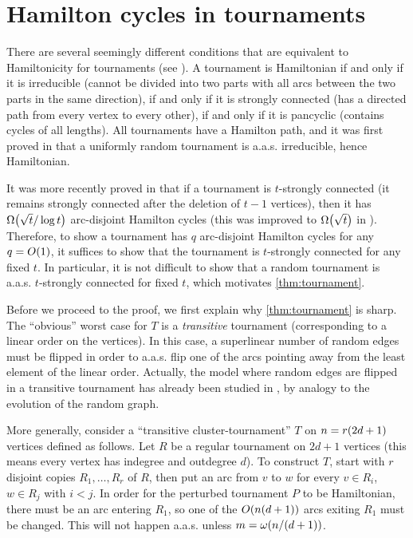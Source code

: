 \documentclass[11pt,english]{article}
\theoremstyle{plain}
\theoremstyle{definition}
\theoremstyle{definition}
\theoremstyle{plain}
\theoremstyle{plain}
\theoremstyle{plain}
\theoremstyle{plain}
\theoremstyle{remark}
\theoremstyle{remark}
\let\originalleft\left
\let\originalright\right
\renewcommand{\left}{\mathopen{}\mathclose\bgroup\originalleft}
\renewcommand{\right}{\aftergroup\egroup\originalright}
\begin{document}
\section{\label{sec:tournaments}Hamilton cycles in tournaments}

There are several seemingly different conditions that are equivalent
to Hamiltonicity for tournaments (see \cite[Chapters~2-3]{Moo68}).
A tournament is Hamiltonian if and only if it is irreducible (cannot
be divided into two parts with all arcs between the two parts
in the same direction), if and only if it is strongly connected (has
a directed path from every vertex to every other), if and only if
it is pancyclic (contains cycles of all lengths). All tournaments
have a Hamilton path, and it was first proved in \cite{MM62} that
a uniformly random tournament is a.a.s. irreducible, hence Hamiltonian.

It was more recently proved in \cite{KLOP14} that if a tournament
is $t$-strongly connected (it remains strongly connected after the
deletion of $t-1$ vertices), then it has $\Omega\left(\sqrt{t}/\log t\right)$
arc-disjoint Hamilton cycles (this was improved to $\Omega\left(\sqrt{t}\right)$
in \cite{Pok14}). Therefore, to show a tournament has $q$ arc-disjoint Hamilton cycles for any $q=O\left(1\right)$, it suffices to show that the tournament is $t$-strongly connected for any fixed $t$. In particular, it is not difficult to show that a random tournament is a.a.s. $t$-strongly connected for fixed $t$, which motivates \ref{thm:tournament}.

Before we proceed to the proof, we first explain why \ref{thm:tournament}
is sharp. The ``obvious'' worst case for $T$ is a \emph{transitive}
tournament (corresponding to a linear order on the vertices). In this
case, a superlinear number of random edges must be flipped in order to a.a.s.
flip one of the arcs pointing away from the least element of the linear
order. Actually, the model where random edges are flipped in a transitive
tournament has already been studied in \cite{LRG96}, by analogy to
the evolution of the random graph.

More generally, consider a ``transitive cluster-tournament'' $T$
on $n=r\left(2d+1\right)$ vertices defined as follows. Let $R$ be a regular tournament
on $2d+1$ vertices (this means every vertex has indegree and outdegree $d$). To construct $T$, start with $r$ disjoint copies
$R_{1},\dots,R_{r}$ of $R$, then put an arc from $v$ to $w$ for
every $v\in R_{i}$, $w\in R_{j}$ with $i<j$. In order for the perturbed
tournament $P$ to be Hamiltonian, there must be an arc entering $R_{1}$,
so one of the $O\left(n\left(d+1\right)\right)$ arcs exiting $R_{1}$
must be changed. This will not happen a.a.s. unless $m=\omega\left(n/\left(d+1\right)\right)$.
\end{document}
